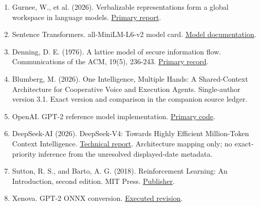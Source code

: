\documentclass[11pt,letterpaper]{article}
\begin{document}
\begin{enumerate}[label=\arabic*.,itemsep=0.35em]
\item\label{ref:8}\begingroup{} Gurnee, W., et al. (2026). Verbalizable representations form a global workspace in language models. \href{https://transformer-circuits.pub/2026/workspace/index.html}{Primary report}.\par\endgroup
\item\label{ref:9}\begingroup{} Sentence Transformers. all-MiniLM-L6-v2 model card. \href{https://huggingface.co/sentence-transformers/all-MiniLM-L6-v2}{Model documentation}.\par\endgroup
\item\label{ref:10}\begingroup{} Denning, D. E. (1976). A lattice model of secure information flow. Communications of the ACM, 19(5), 236-243. \href{https://doi.org/10.1145/360051.360056}{Primary record}.\par\endgroup
\item\label{ref:11}\begingroup{} Blumberg, M. (2026). One Intelligence, Multiple Hands: A Shared-Context Architecture for Cooperative Voice and Execution Agents. Single-author version 3.1. Exact version and comparison in the companion source ledger.\par\endgroup
\item\label{ref:12}\begingroup{} OpenAI. GPT-2 reference model implementation. \href{https://raw.githubusercontent.com/openai/gpt-2/master/src/model.py}{Primary code}.\par\endgroup
\item\label{ref:13}\begingroup{} DeepSeek-AI (2026). DeepSeek-V4: Towards Highly Efficient Million-Token Context Intelligence. \href{https://arxiv.org/html/2606.19348v1}{Technical report}. Architecture mapping only; no exact-priority inference from the unresolved displayed-date metadata.\par\endgroup
\item\label{ref:14}\begingroup{} Sutton, R. S., and Barto, A. G. (2018). Reinforcement Learning: An Introduction, second edition. MIT Press. \href{https://mitpress.mit.edu/9780262039246/reinforcement-learning/}{Publisher}.\par\endgroup
\item\label{ref:15}\begingroup{} Xenova. GPT-2 ONNX conversion. \href{https://huggingface.co/Xenova/gpt2/tree/bf2c7f02e0b826c60d03af341171bde20893da66}{Executed revision}.\par\endgroup

\end{enumerate}
\end{document}
